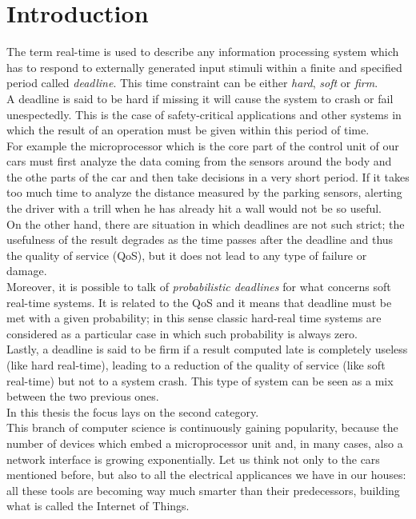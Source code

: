 \chapter{Introduction}\label{chp:introduction}


The term real-time is used to describe any information processing system which has to respond to externally generated input stimuli within a finite and specified period called \emph{deadline}.
This time constraint can be either \emph{hard}, \emph{soft} or \emph{firm}.\\
A deadline is said to be hard if missing it will cause the system to crash or fail unespectedly. This is the case of safety-critical applications and other systems in which the result of an operation must be given within this period of time.\\
For example the microprocessor which is the core part of the control unit of our cars must first analyze the data coming from the sensors around the body and the othe parts of the car and then take decisions in a very short period. If it takes too much time to analyze the distance measured by the parking sensors, alerting the driver with a trill when he has already hit a wall would not be so useful.\\
On the other hand, there are situation in which deadlines are not such strict; the usefulness of the result degrades as the time passes after the deadline and thus the quality of service (QoS), but it does not lead to any type of failure or damage.\\
Moreover, it is possible to talk of \emph{probabilistic deadlines} for what concerns soft real-time systems. It is related to the QoS and it means that deadline must be met with a given probability; in this sense classic hard-real time systems are considered as a particular case in which such probability is always zero.\\ 
Lastly, a deadline is said to be firm if a result computed late is completely useless (like hard real-time), leading to a reduction of the quality of service (like soft real-time) but not to a system crash. This type of system can be seen as a mix between the two previous ones.\\
In this thesis the focus lays on the second category.\\
This branch of computer science is continuously gaining popularity, because the number of devices which embed a microprocessor unit and, in many cases, also a network interface is growing exponentially. Let us think not only to the cars mentioned before, but also to all the electrical applicances we have in our houses: all these tools are becoming way much smarter than their predecessors, building what is called the Internet of Things.    